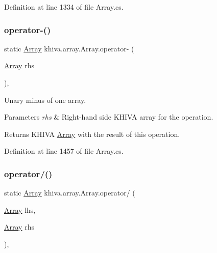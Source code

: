 Definition at line 1334 of file Array.\+cs.

\mbox{\label{classkhiva_1_1array_1_1_array_a617cc526ee701a1f1d6c8f9513a3b3dc}} 
\subsubsection{\texorpdfstring{operator-\/()}{operator-()}\hspace{0.1cm}{\footnotesize\ttfamily [2/2]}}
{\footnotesize\ttfamily static \mbox{\hyperlink{classkhiva_1_1array_1_1_array}{Array}} khiva.\+array.\+Array.\+operator-\/ (\begin{DoxyParamCaption}\item[{\mbox{\hyperlink{classkhiva_1_1array_1_1_array}{Array}}}]{rhs }\end{DoxyParamCaption})\hspace{0.3cm}{\ttfamily [inline]}, {\ttfamily [static]}}



Unary minus of one array. 


\begin{DoxyParams}{Parameters}
{\em rhs} & Right-\/hand side K\+H\+I\+VA array for the operation.\\
\hline
\end{DoxyParams}
\begin{DoxyReturn}{Returns}
K\+H\+I\+VA \mbox{\hyperlink{classkhiva_1_1array_1_1_array}{Array}} with the result of this operation.
\end{DoxyReturn}


Definition at line 1457 of file Array.\+cs.

\mbox{\label{classkhiva_1_1array_1_1_array_ab2e76a11f2c6a71975ef5f0fde70eab8}} 
\subsubsection{\texorpdfstring{operator/()}{operator/()}}
{\footnotesize\ttfamily static \mbox{\hyperlink{classkhiva_1_1array_1_1_array}{Array}} khiva.\+array.\+Array.\+operator/ (\begin{DoxyParamCaption}\item[{\mbox{\hyperlink{classkhiva_1_1array_1_1_array}{Array}}}]{lhs,  }\item[{\mbox{\hyperlink{classkhiva_1_1array_1_1_array}{Array}}}]{rhs }\end{DoxyParamCaption})\hspace{0.3cm}{\ttfamily [inline]}, {\ttfamily [static]}}



